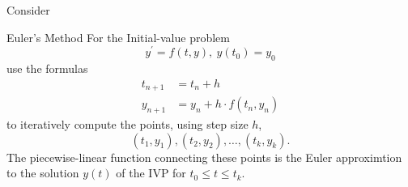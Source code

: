 \documentclass{beamer}
\begin{document}
\begin{frame}
\begin{block}{Consider}
\begin{overprint}
\vspace{-5mm}
\end{overprint}
\vspace{-3mm}
\end{block}
\end{frame}

\begin{frame}
\begin{block}{Euler's Method}
For the Initial-value problem
\[y^\prime=f(t,y),\ y(t_0)=y_0\]
use the formulas
\begin{align*}
t_{n+1} &= t_n + h\\
y_{n+1} &= y_n+h\cdot f(t_n, y_n)
\end{align*}
to iteratively compute the points, using step size $h$, 
\[(t_1, y_1), (t_2, y_2), \dots, (t_k, y_k).\]
The piecewise-linear function connecting these points is the Euler approximtion to the solution $y(t)$ of the IVP for $t_0\leq t\leq t_k$.
\end{block}
\end{frame}
\end{document}
